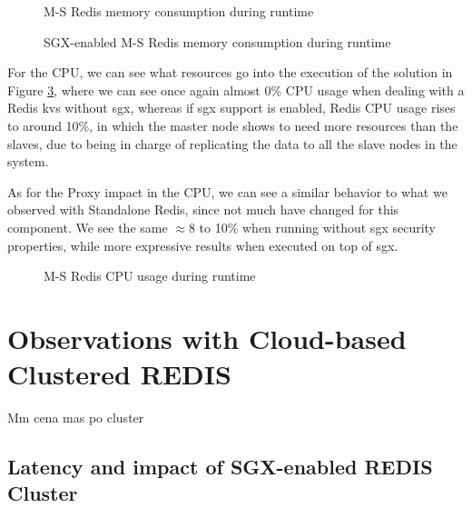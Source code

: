 \begin{figure}[htbp]
	\centering
	\caption{M-S Redis memory consumption during runtime}
	\label{fig:noSgxMemoryConsumption}
\end{figure}

\begin{figure}[htbp]
	\centering
	\caption{SGX-enabled M-S Redis memory consumption during runtime}
	\label{fig:sgxMemoryConsumption}
\end{figure}

For the CPU, we can see what resources go into the execution of the solution in Figure \ref{fig:cpuUsageMS}, where we can see once again almost 0\% CPU usage when dealing with a Redis \gls{kvs} without \gls{sgx}, whereas if \gls{sgx} support is enabled, Redis CPU usage rises to around 10\%, in which the master node shows to need more resources than the slaves, due to being in charge of replicating the data to all the slave nodes in the system.

As for the Proxy impact in the CPU, we can see a similar behavior to what we observed with Standalone Redis, since not much have changed for this component. We see the same $\approx$8 to 10\% when running without \gls{sgx} security properties, while more expressive results when executed on top of \gls{sgx}.

\begin{figure}[htbp]
	\centering
	\caption{M-S Redis CPU usage during runtime}
	\label{fig:cpuUsageMS}
\end{figure}

\section{Observations with Cloud-based Clustered REDIS}
Mm cena mas po cluster

\subsection{Latency and impact of SGX-enabled REDIS Cluster}

